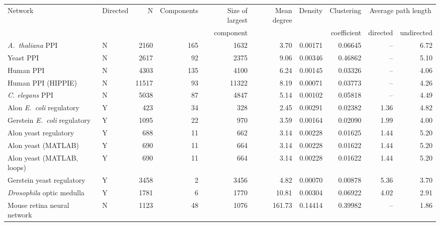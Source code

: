 \begin{tabular}{llrrrrrrrr}
\hline
Network & Directed & N  &   Components &  Size of largest &Mean degree     &    Density & Clustering  & \multicolumn{2}{c}{Average path length}\\
        &          &    &              &  component       &                &            &  coefficient & directed & undirected \\
\hline
\textit{A.~thaliana} PPI & N & 2160 & 165 & 1632 & 3.70 & 0.00171 & 0.06645 & -- & 6.72\\
Yeast PPI & N & 2617 & 92 & 2375 & 9.06 & 0.00346 & 0.46862 & -- & 5.10\\
Human PPI & N & 4303 & 135 & 4100 & 6.24 & 0.00145 & 0.03326 & -- & 4.06\\
Human PPI (HIPPIE) & N & 11517 & 93 & 11322 & 8.19 & 0.00071 & 0.03773 & -- & 4.26\\
\textit{C. elegans} PPI & N & 5038 & 87 & 4847 & 5.14 & 0.00102 & 0.05818 & -- & 4.49\\
Alon \textit{E.~coli} regulatory & Y & 423 & 34 & 328 & 2.45 & 0.00291 & 0.02382 & 1.36 & 4.82\\
Gerstein \textit{E.~coli} regulatory & Y & 1095 & 22 & 970 & 3.59 & 0.00164 & 0.02090 & 1.99 & 4.00\\
Alon yeast regulatory & Y & 688 & 11 & 662 & 3.14 & 0.00228 & 0.01625 & 1.44 & 5.20\\
Alon yeast (MATLAB) & Y & 690 & 11 & 664 & 3.14 & 0.00228 & 0.01622 & 1.44 & 5.20\\
Alon yeast (MATLAB, loops) & Y & 690 & 11 & 664 & 3.14 & 0.00228 & 0.01622 & 1.44 & 5.20\\
Gerstein yeast regulatory & Y & 3458 & 2 & 3456 & 4.82 & 0.00070 & 0.00878 & 5.36 & 3.70\\
\textit{Drosophila} optic medulla & Y & 1781 & 6 & 1770 & 10.81 & 0.00304 & 0.06922 & 4.02 & 2.91\\
Mouse retina neural network & N & 1123 & 48 & 1076 & 161.73 & 0.14414 & 0.39982 & -- & 1.86\\
\hline
\end{tabular}
